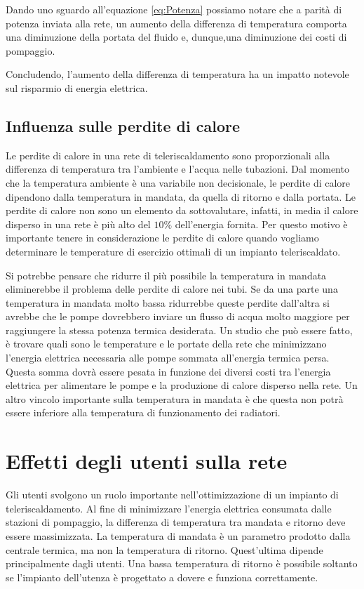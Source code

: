 \documentclass[laurea,oneside,11pt]{USiena_tesiLM}
\begin{document}
Dando uno sguardo all'equazione \ref{eq:Potenza} possiamo notare che a parità di potenza inviata alla rete, un aumento della differenza di temperatura comporta una diminuzione della portata del fluido e, dunque,una diminuzione dei costi di pompaggio.

Concludendo, l'aumento della differenza di temperatura ha un impatto notevole sul risparmio di energia elettrica.


\subsection{Influenza sulle perdite di calore}
Le perdite di calore in una rete di teleriscaldamento sono proporzionali alla differenza di temperatura tra l'ambiente e l'acqua nelle tubazioni. Dal momento che la temperatura ambiente è una variabile non decisionale, le perdite di calore dipendono dalla temperatura in mandata, da quella di ritorno e dalla portata. Le perdite di calore non sono un elemento da sottovalutare, infatti, in media il calore disperso in una rete è più alto del $10\%$ dell'energia fornita. Per questo motivo è importante tenere in considerazione le perdite di calore quando vogliamo determinare le temperature di esercizio ottimali di un impianto teleriscaldato.

Si potrebbe pensare che ridurre il più possibile la temperatura in mandata eliminerebbe il problema delle perdite di calore nei tubi. Se da una parte una temperatura in mandata molto bassa ridurrebbe queste perdite dall'altra si avrebbe che le pompe dovrebbero inviare un flusso di acqua molto maggiore per raggiungere la stessa potenza termica desiderata. Un studio che può essere fatto, è trovare quali sono le temperature e le portate  della rete che minimizzano l'energia elettrica necessaria alle pompe sommata all'energia termica persa. Questa somma dovrà essere pesata in funzione dei diversi costi tra l'energia elettrica per alimentare le pompe e la produzione di calore disperso nella rete.
Un altro vincolo importante sulla temperatura in mandata è che questa non potrà essere inferiore alla temperatura di funzionamento dei radiatori.  

\section{Effetti degli utenti sulla rete}
Gli utenti svolgono un ruolo importante nell'ottimizzazione di un impianto di teleriscaldamento. Al fine di minimizzare l'energia elettrica consumata dalle stazioni di pompaggio, la differenza di temperatura tra mandata e ritorno deve essere massimizzata. La temperatura di mandata è un parametro prodotto dalla centrale termica, ma non la temperatura di ritorno. Quest'ultima dipende principalmente dagli utenti. Una bassa temperatura di ritorno è possibile soltanto se l'impianto dell'utenza è progettato a dovere e funziona correttamente.
\end{document}
